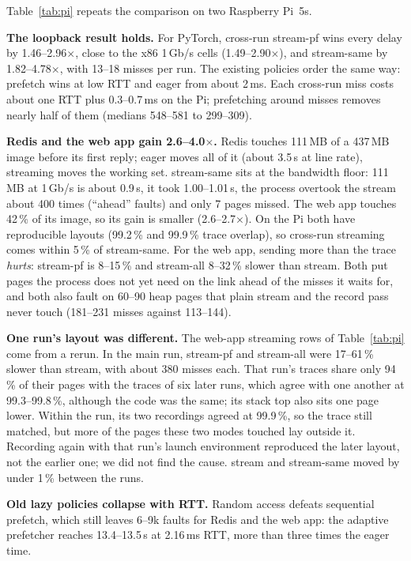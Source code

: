 \documentclass[conference]{IEEEtran}
\newcommand{\mode}[1]{\textsf{#1}}
\begin{document}
Table~\ref{tab:pi} repeats the comparison on two Raspberry Pi~5s.

\textbf{The loopback result holds.} For PyTorch, cross-run
\mode{stream-pf} wins every delay by 1.46--2.96$\times$, close to the x86
1\,Gb/s cells (1.49--2.90$\times$), and \mode{stream-same} by
1.82--4.78$\times$, with 13--18 misses per run. The existing policies order
the same way: prefetch wins at low RTT and eager from about 2\,ms. Each
cross-run miss costs about one RTT plus 0.3--0.7\,ms on the Pi;
prefetching around misses removes nearly half of them (medians 548--581 to 299--309).

\textbf{Redis and the web app gain 2.6--4.0$\times$.} Redis touches
111\,MB of a 437\,MB image before its first reply; eager moves all of it
(about 3.5\,s at line rate), streaming moves the working set.
\mode{stream-same} sits at the bandwidth floor: 111\,MB at 1\,Gb/s is about
0.9\,s, it took 1.00--1.01\,s, the process overtook the stream about 400
times (``ahead'' faults) and only 7 pages missed. The web app touches
42\,\% of its image, so its gain is smaller (2.6--2.7$\times$). On the Pi
both have reproducible layouts (99.2\,\% and 99.9\,\% trace overlap), so
cross-run streaming comes within 5\,\% of \mode{stream-same}. For the
web app, sending more than the trace \emph{hurts}: \mode{stream-pf} is
8--15\,\% and \mode{stream-all} 8--32\,\% slower than \mode{stream}. Both
put pages the process does not yet need on the link ahead of the misses it
waits for, and both also fault on 60--90 heap pages that plain
\mode{stream} and the record pass never touch (181--231 misses against
113--144).

\textbf{One run's layout was different.} The web-app streaming rows of
Table~\ref{tab:pi} come from a rerun. In the main run, \mode{stream-pf}
and \mode{stream-all} were 17--61\,\% slower than \mode{stream}, with
about 380 misses each. That run's traces share only 94\,\% of their pages
with the traces of six later runs, which agree with one another at
99.3--99.8\,\%, although the code was the same; its
stack top also sits one page lower. Within the run, its two recordings
agreed at 99.9\,\%, so the trace still matched, but more of the pages
these two modes touched lay outside it. Recording again with that run's
launch environment reproduced the later layout, not the earlier one; we
did not find the cause. \mode{stream} and \mode{stream-same} moved by
under 1\,\% between the runs.

\textbf{Old lazy policies collapse with RTT.} Random access defeats
sequential prefetch, which still leaves 6--9k faults for Redis and the web
app: the adaptive prefetcher reaches 13.4--13.5\,s at 2.16\,ms RTT, more
than three times the eager time.
\end{document}
